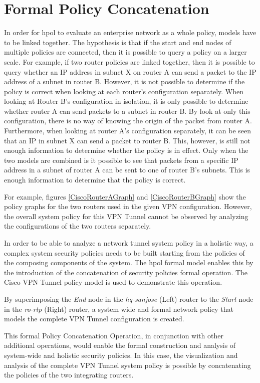 \documentclass[12pt,letterpaper]{report}
\begin{document}
\section{Formal Policy Concatenation}
In order for \ac{hpol} to evaluate an enterprise network as a whole policy, models have to be linked together. The hypothesis is that if the start and end nodes of multiple policies are connected, then it is possible to query a policy on a larger scale. For example, if two router policies are linked together, then it is possible to query whether an IP address in subnet X on router A can send a packet to the IP address of a subnet in router B. However, it is not possible to determine if the policy is correct when looking at each router's configuration separately. When looking at Router B's configuration in isolation, it is only possible to determine whether router A can send packets to a subnet in router B. By look at only this configuration, there is no way of knowing the origin of the packet from router A. Furthermore, when looking at router A's configuration separately, it can be seen that an IP in subnet X can send a packet to router B. This, however, is still not enough information to determine whether the policy is in effect. Only when the two models are combined is it possible to see that packets from a specific IP address in a subnet of router A can be sent to one of router B's subnets. This is enough information to determine that the policy is correct.

For example, figures {\ref{CiscoRouterAGraph}} and {\ref{CiscoRouterBGraph}} show the policy graphs for the two routers used in the given VPN configuration. However, the overall system policy for this VPN Tunnel cannot be observed by analyzing the configurations of the two routers separately.

{In order to be able to analyze a network tunnel system policy in a holistic way, a complex system security policies needs to be built starting from the policies of the composing components of the system. The \ac{hpol} formal model enables this by the introduction of the concatenation of security policies formal operation. The Cisco VPN Tunnel policy model is used to demonstrate this operation.}

{By superimposing the {\textsl{End}} node in the {\textsl{hq-sanjose}} (Left) router to the {\textsl{Start}} node in the {\textsl{ro-rtp}} (Right) router, a system wide and formal network policy that models the complete VPN Tunnel configuration is created.}

{This formal Policy Concatenation Operation, in conjunction with other additional operations, would enable the formal construction and analysis of system-wide and holistic security policies. In this case, the visualization and analysis of the complete VPN Tunnel system policy is possible by concatenating the policies of the two integrating routers.}
\end{document}
